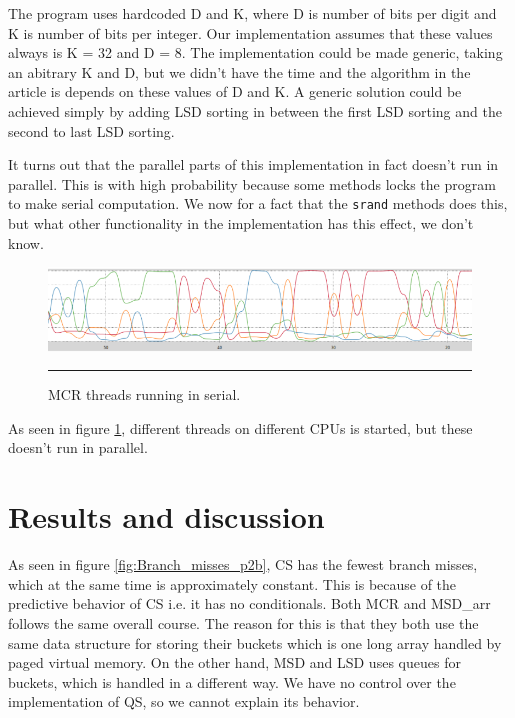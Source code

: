 The program uses hardcoded D and K, where D is number of bits per digit and K is number of bits per integer. Our implementation assumes that these values always is K = 32 and D = 8.
The implementation could be made generic, taking an abitrary K and D, but we didn't have the time and the algorithm in the article is depends on these values of D and K.
A generic solution could be achieved simply by adding LSD sorting in between the first LSD sorting and the second to last LSD sorting.

It turns out that the parallel parts of this implementation in fact doesn't run in parallel. This is with high probability because some methods locks the program to make serial computation.
We now for a fact that the \verb!srand! methods does this, but what other functionality in the implementation has this effect, we don't know.

\begin{figure}[htbp]
	\centering
		\includegraphics[width=\textwidth]{./Figures/Project2b/multicore_cpu_usage.png}
		\rule{35em}{0.5pt}
	\caption[Multicore CPU usage]{
	MCR threads running in serial.
	}
	\label{fig:multicore_cpu_usage}
\end{figure}

As seen in figure \ref{fig:multicore_cpu_usage}, different threads on different CPUs is started, but these doesn't run in parallel.

\section{Results and discussion}

As seen in figure \ref{fig:Branch_misses_p2b}, CS has the fewest branch misses, which at the same time is approximately constant. This is because of the predictive behavior of CS i.e. it has no conditionals.
Both MCR and MSD\_arr follows the same overall course. The reason for this is that they both use the same data structure for storing their buckets which is one long array handled by paged virtual memory.
On the other hand, MSD and LSD uses queues for buckets, which is handled in a different way.
We have no control over the implementation of QS, so we cannot explain its behavior.

